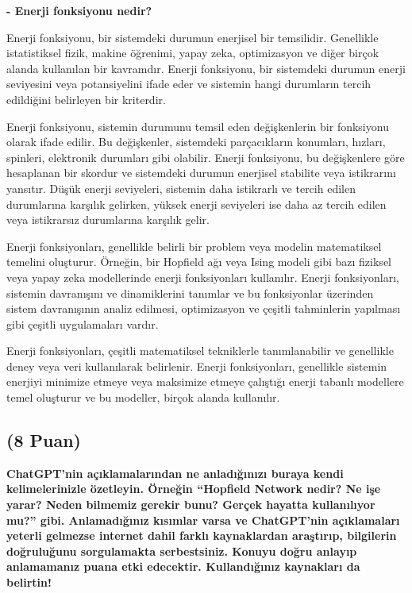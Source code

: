 \documentclass[11pt]{article}
\begin{document}
\textbf{- Enerji fonksiyonu nedir?}

    Enerji fonksiyonu, bir sistemdeki durumun enerjisel bir temsilidir. Genellikle istatistiksel fizik, makine öğrenimi, yapay zeka, optimizasyon ve diğer birçok alanda kullanılan bir kavramdır. Enerji fonksiyonu, bir sistemdeki durumun enerji seviyesini veya potansiyelini ifade eder ve sistemin hangi durumların tercih edildiğini belirleyen bir kriterdir.
    
    Enerji fonksiyonu, sistemin durumunu temsil eden değişkenlerin bir fonksiyonu olarak ifade edilir. Bu değişkenler, sistemdeki parçacıkların konumları, hızları, spinleri, elektronik durumları gibi olabilir. Enerji fonksiyonu, bu değişkenlere göre hesaplanan bir skordur ve sistemdeki durumun enerjisel stabilite veya istikrarını yansıtır. Düşük enerji seviyeleri, sistemin daha istikrarlı ve tercih edilen durumlarına karşılık gelirken, yüksek enerji seviyeleri ise daha az tercih edilen veya istikrarsız durumlarına karşılık gelir.
    
    Enerji fonksiyonları, genellikle belirli bir problem veya modelin matematiksel temelini oluşturur. Örneğin, bir Hopfield ağı veya Ising modeli gibi bazı fiziksel veya yapay zeka modellerinde enerji fonksiyonları kullanılır. Enerji fonksiyonları, sistemin davranışını ve dinamiklerini tanımlar ve bu fonksiyonlar üzerinden sistem davranışının analiz edilmesi, optimizasyon ve çeşitli tahminlerin yapılması gibi çeşitli uygulamaları vardır.
    
    Enerji fonksiyonları, çeşitli matematiksel tekniklerle tanımlanabilir ve genellikle deney veya veri kullanılarak belirlenir. Enerji fonksiyonları, genellikle sistemin enerjiyi minimize etmeye veya maksimize etmeye çalıştığı enerji tabanlı modellere temel oluşturur ve bu modeller, birçok alanda kullanılır.



\subsection{(8 Puan)} \textbf{ChatGPT’nin açıklamalarından ne anladığınızı buraya kendi kelimelerinizle özetleyin. Örneğin ``Hopfield Network nedir? Ne işe yarar? Neden bilmemiz gerekir bunu? Gerçek hayatta kullanılıyor mu?'' gibi. Anlamadığınız kısımlar varsa ve ChatGPT’nin açıklamaları yeterli gelmezse internet dahil farklı kaynaklardan araştırıp, bilgilerin doğruluğunu sorgulamakta serbestsiniz. Konuyu doğru anlayıp anlamamanız puana etki edecektir. Kullandığınız kaynakları da belirtin!}
\end{document}
